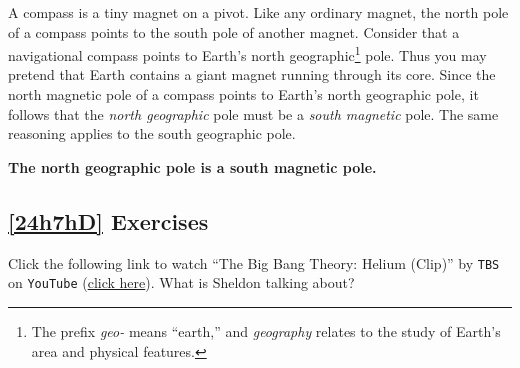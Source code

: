 \documentclass{article}
\begin{document}
\vspace{1em}

A compass is a tiny magnet on a pivot. Like any ordinary magnet, the north pole of a compass points to the south pole of another magnet. Consider that a navigational compass points to Earth's north geographic\footnote{The prefix \textit{geo-} means ``earth,'' and \textit{geography} relates to the study of Earth's area and physical features.} pole. Thus you may pretend that Earth contains a giant magnet running through its core. Since the north magnetic pole of a compass points to Earth's north geographic pole, it follows that the \textit{north geographic} pole must be a \textit{south magnetic} pole. The same reasoning applies to the south geographic pole.

\clearpage
\begin{center}
\centering
    \textbf{The north geographic pole is a south magnetic pole.}
\end{center}


\begin{center}

\captionsetup{type=figure,margin=1in}
\end{center}

\subsection*{\ref{24h7hD} Exercises}

\begin{exercise}
    Click the following link to watch ``The Big Bang Theory: Helium (Clip)'' by \texttt{TBS} on \texttt{YouTube} (\href{https://youtu.be/Q6Z0pCax9b8}{click here}). What is Sheldon talking about?
\end{exercise}
\end{document}
